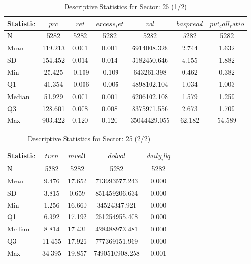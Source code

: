     \begin{table}[H]
    \centering

    
    \caption{Descriptive Statistics for Sector: 25 (1/2)}
    \label{tab:sec25_a}
    
    \begin{tabular}{lcccccc}
    \toprule
    Statistic & $prc$ & $ret$ & $excess_ret$ & $vol$ & $baspread$ & $put_call_ratio$ \\\midrule
    N & 5282 & 5282 & 5282 & 5282 & 5282 & 5282 \\
    Mean & 119.213 & 0.001 & 0.001 & 6914008.328 & 2.744 & 1.632 \\
    SD & 154.452 & 0.014 & 0.014 & 3182450.646 & 4.155 & 1.882 \\
    Min & 25.425 & -0.109 & -0.109 & 643261.398 & 0.462 & 0.382 \\
    Q1 & 40.354 & -0.006 & -0.006 & 4898102.104 & 1.034 & 1.003 \\
    Median & 51.929 & 0.001 & 0.001 & 6206102.108 & 1.579 & 1.259 \\
    Q3 & 128.601 & 0.008 & 0.008 & 8375971.556 & 2.673 & 1.709 \\
    Max & 903.422 & 0.120 & 0.120 & 35044429.055 & 62.182 & 54.589 \\
    \bottomrule
    \end{tabular}

    \end{table}
    
    \begin{table}[H]
    \centering

    
    \caption{Descriptive Statistics for Sector: 25 (2/2)}
    \label{tab:sec25_b}
    
    \begin{tabular}{lcccc}
    \toprule
    Statistic & $turn$ & $mvel1$ & $dolvol$ & $daily_illq$ \\\midrule
    N & 5282 & 5282 & 5282 & 5282 \\
    Mean & 9.476 & 17.652 & 713993577.243 & 0.000 \\
    SD & 3.815 & 0.659 & 851459206.634 & 0.000 \\
    Min & 1.256 & 16.660 & 34524347.921 & 0.000 \\
    Q1 & 6.992 & 17.192 & 251254955.408 & 0.000 \\
    Median & 8.814 & 17.431 & 428488973.481 & 0.000 \\
    Q3 & 11.455 & 17.926 & 777369151.969 & 0.000 \\
    Max & 34.395 & 19.857 & 7490510908.258 & 0.001 \\
    \bottomrule
    \end{tabular}

    \end{table}
    
